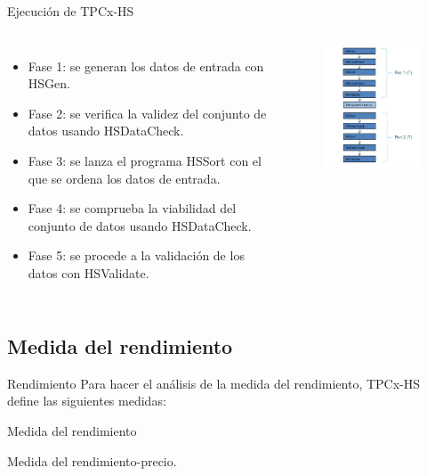 		\begin{frame}{Ejecución de TPCx-HS}
				\begin{columns}[c]
					
					\begin{itemize}
						\item Fase 1: se generan los datos de entrada con HSGen.
						\item Fase 2: se verifica la validez del conjunto de datos usando HSDataCheck.
						\item Fase 3: se lanza el programa HSSort con el que se ordena los datos de entrada.
						\item Fase 4: se comprueba la viabilidad del conjunto de datos usando HSDataCheck.
						\item Fase 5: se procede a la validación de los datos con HSValidate.
					\end{itemize}
					
					\begin{figure}[H]
						\centering
						\includegraphics[width=5cm]{./Images/executionsTPC.png}
					\end{figure}

				\end{columns}
	
		\end{frame}
		
	\subsection*{Medida del rendimiento}	
			
		\begin{frame}{Rendimiento}
			Para hacer el análisis de la medida del rendimiento, TPCx-HS define las siguientes medidas:
			
			\color{ChetwodeBlue}\large Medida del rendimiento
			
			\color{ChetwodeBlue}\large Medida del rendimiento-precio.
		\end{frame}
				 